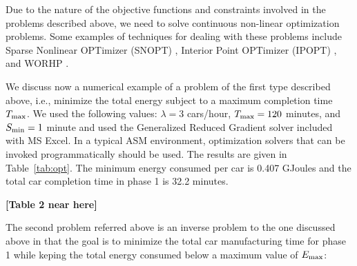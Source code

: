 \documentclass[a4paper, 12pt]{article} %
\begin{document}

Due to the nature of the objective functions and constraints involved in the problems described above, we need to solve  continuous non-linear optimization problems.  Some examples of techniques for dealing with these problems
include Sparse Nonlinear OPTimizer (SNOPT) \cite{Gill2002}, Interior Point OPTimizer (IPOPT) \cite{Biegler2009}, and WORHP \cite{wohrp2013}.





We discuss now a numerical  example of a problem of the first type described above, i.e., minimize the total energy subject to a maximum completion time $T_{\rm max}$. We used the following values: $\lambda =3$ cars/hour, $T_{\rm max} = 120$ minutes, and $S_{\rm min} = 1$ minute and used the Generalized Reduced Gradient solver included with MS Excel. In a typical ASM environment, optimization solvers that can be invoked programmatically should be used. The results are given in Table~\ref{tab:opt}. The minimum energy consumed per car is 0.407 GJoules and the total car completion time in phase 1 is 32.2 minutes.

{\bf [Table 2 near here]}

The second problem referred above is an inverse problem to the one discussed above in that the goal is to  minimize the total car manufacturing time for phase 1 while keping the total energy consumed below a maximum value of $E_{\rm max}$:
\end{document}
